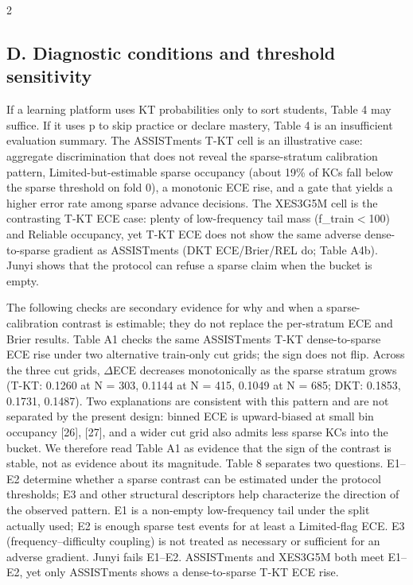 \documentclass[10pt,a4paper]{article}
\begin{document}
\begin{multicols}{2}


\subsection*{D. Diagnostic conditions and threshold sensitivity}

If a learning platform uses KT probabilities only to sort students, Table 4 may suffice. If it uses p to skip practice or declare mastery, Table 4 is an insufficient evaluation summary. The ASSISTments T-KT cell is an illustrative case: aggregate discrimination that does not reveal the sparse-stratum calibration pattern, Limited-but-estimable sparse occupancy (about 19\% of KCs fall below the sparse threshold on fold 0), a monotonic ECE rise, and a gate that yields a higher error rate among sparse advance decisions. The XES3G5M cell is the contrasting T-KT ECE case: plenty of low-frequency tail mass (f\_train$<$100) and Reliable occupancy, yet T-KT ECE does not show the same adverse dense-to-sparse gradient as ASSISTments (DKT ECE/Brier/REL do; Table A4b). Junyi shows that the protocol can refuse a sparse claim when the bucket is empty.

The following checks are secondary evidence for why and when a sparse-calibration contrast is estimable; they do not replace the per-stratum ECE and Brier results. Table A1 checks the same ASSISTments T-KT dense-to-sparse ECE rise under two alternative train-only cut grids; the sign does not flip. Across the three cut grids, $\Delta$ECE decreases monotonically as the sparse stratum grows (T-KT: 0.1260 at N = 303, 0.1144 at N = 415, 0.1049 at N = 685; DKT: 0.1853, 0.1731, 0.1487). Two explanations are consistent with this pattern and are not separated by the present design: binned ECE is upward-biased at small bin occupancy [26], [27], and a wider cut grid also admits less sparse KCs into the bucket. We therefore read Table A1 as evidence that the sign of the contrast is stable, not as evidence about its magnitude. Table 8 separates two questions. E1--E2 determine whether a sparse contrast can be estimated under the protocol thresholds; E3 and other structural descriptors help characterize the direction of the observed pattern. E1 is a non-empty low-frequency tail under the split actually used; E2 is enough sparse test events for at least a Limited-flag ECE. E3 (frequency--difficulty coupling) is not treated as necessary or sufficient for an adverse gradient. Junyi fails E1--E2. ASSISTments and XES3G5M both meet E1--E2, yet only ASSISTments shows a dense-to-sparse T-KT ECE rise.


\end{multicols}
\end{document}
